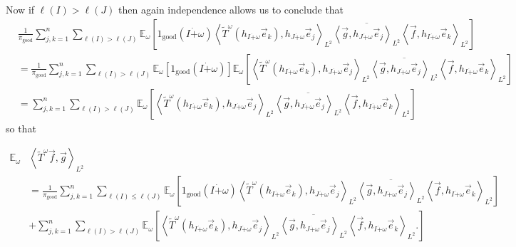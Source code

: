 \documentclass[12pt,reqno ]{amsart}
\numberwithin{equation}{section}
\theoremstyle{definition}
\newcommand{\Ew}{\ensuremath{\mathbb{E}_\omega}}
\newcommand{\V}[1]{\ensuremath{\vec{#1}}}
\newcommand{\ip}[2]{\ensuremath{\left\langle#1,#2\right\rangle}}
\newcommand{\T}[1]{\ensuremath{\text{#1}}}
\begin{document}
Now if $\ell(I) > \ell(J)$ then again independence allows us to conclude that \begin{align*} & \frac{1}{\pi_{\T{good}}} \sum_{j, k = 1}^n   \sum_{\ell(I) > \ell(J) }   \Ew \left[1_\text{good} (I \dot+ \omega) \ip{\widetilde{T} ^\omega (h_{I \dot+ \omega} \V{e}_k )}{ h_{J \dot+ \omega} \V{e}_j}_{L^2} \overline{\ip{\vec{g}}{h_{J \dot+ \omega} \V{e}_j }_{L^2}}  \ip{\vec{f}}{ h_{I \dot +\omega} \V{e}_k}_{L^2}\right] \\ & = \frac{1}{\pi_{\T{good}}} \sum_{j, k = 1}^n  \sum_{\ell(I) > \ell(J) }   \Ew \left[1_\text{good} (I \dot+ \omega)\right] \Ew \left[\ip{\widetilde{T} ^\omega (h_{I \dot+ \omega} \V{e}_k )}{ h_{J \dot+ \omega} \V{e}_j}_{L^2} \overline{\ip{\vec{g}}{h_{J \dot+ \omega} \V{e}_j }_{L^2}}  \ip{\vec{f}}{ h_{I \dot +\omega} \V{e}_k}_{L^2}\right] \\ & = \sum_{j, k = 1}^n   \sum_{\ell(I) > \ell(J) }   \Ew \left[\ip{\widetilde{T} ^\omega (h_{I \dot+ \omega} \V{e}_k )}{ h_{J \dot+ \omega} \V{e}_j}_{L^2} \overline{\ip{\vec{g}}{h_{J \dot+ \omega} \V{e}_j }_{L^2}}  \ip{\vec{f}}{ h_{I \dot +\omega} \V{e}_k}_{L^2}\right] \end{align*} so that

\begin{align*}\Ew & \ip{\widetilde{T}^\omega \vec{f}}{\vec{g}}_{L^2} \\ & =  \frac{1}{\pi_{\text{good}}} \sum_{j, k = 1}^n  \sum_{\ell(I) \leq \ell(J) }   \Ew  \left[1_\text{good} (I \dot+ \omega) \ip{\widetilde{T} ^\omega (h_{I \dot+ \omega} \V{e}_k )}{ h_{J \dot+ \omega} \V{e}_j}_{L^2} \overline{\ip{\vec{g}}{h_{J \dot+ \omega} \V{e}_j }_{L^2}}  \ip{\vec{f}}{ h_{I \dot +\omega} \V{e}_k}_{L^2}\right] \\ & + \sum_{j, k = 1}^n   \sum_{\ell(I) > \ell(J) }   \Ew \left[\ip{\widetilde{T} ^\omega (h_{I \dot+ \omega} \V{e}_k )}{ h_{J \dot+ \omega} \V{e}_j}_{L^2} \overline{\ip{\vec{g}}{h_{J \dot+ \omega} \V{e}_j }_{L^2}}  \ip{\vec{f}}{ h_{I \dot +\omega} \V{e}_k}_{L^2}.\right] \end{align*}
\end{document}
